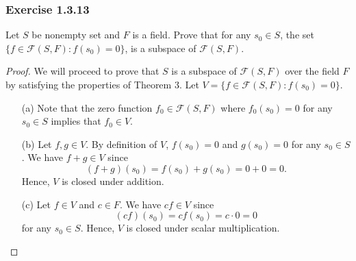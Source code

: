 \subsubsection{Exercise 1.3.13} Let \( S  \) be nonempty set and \( F  \) is a field. Prove that for any \( s_{0} \in S  \), the set \( \{ f \in \mathcal{F}(S,F ) : f(s_{0}) = 0  \}  \), is a subspace of \( \mathcal{F}(S,F) \).
\begin{proof}
    We will proceed to prove that \( S  \) is a subspace of \( \mathcal{F}(S,F)  \) over the field \( F   \) by satisfying the properties of Theorem 3. Let \( V = \{  f \in \mathcal{F}(S,F) : f(s_{0}) = 0  \}   \). 
    \begin{enumerate}
        \item[(a)] Note that the zero function \( f_{0} \in \mathcal{F}(S,F)  \) where \( f_{0}(s_{0}) = 0  \) for any \( s_{0} \in S  \) implies that \( f_{0} \in  V  \).
        \item[(b)] Let \( f,g \in V  \). By definition of \( V  \), \( f(s_{0}) = 0  \) and \( g(s_{0} ) = 0  \) for any \( s_{0} \in S \). We have \(  f + g \in V  \) since
            \[  (f+g)(s_{0}) = f(s_{0}) + g(s_{0}) = 0 + 0 = 0. \]
        Hence, \( V  \) is closed under addition.
        \item[(c)] Let \( f \in V  \) and \( c \in F  \). We have \( cf \in V  \) since 
            \[  (cf)(s_{0}) = c f(s_{0}) = c \cdot 0 = 0  \] for any \( s_{0} \in S  \). Hence, \( V  \) is closed under scalar multiplication.
    \end{enumerate} 
\end{proof}

